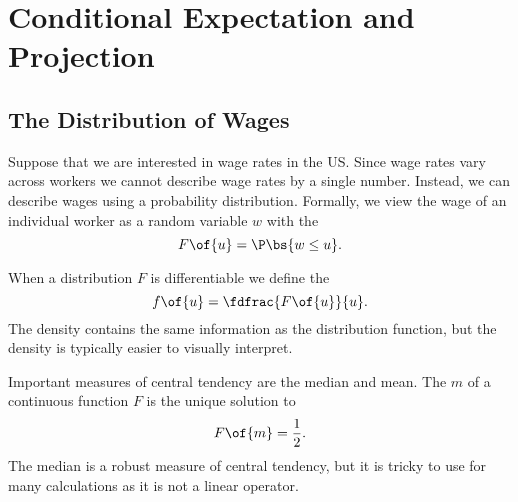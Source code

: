 
\setcounter{chapter}{1}
\chapter{Conditional Expectation and Projection}


\setcounter{section}{1}

\section{The Distribution of Wages}

Suppose that we are interested in wage rates in the US. Since wage rates vary across workers we cannot describe wage rates by a single number. Instead, we can describe wages using a probability distribution. Formally, we view the wage of an individual worker as a random variable $w$ with the 
\begin{equation}
    \notag 
    F\of{u} = \P\bs{w \leq u}.
\end{equation}

When a distribution $F$ is differentiable we define the  
\begin{equation}
    \notag 
    f\of{u} = \fdfrac{F\of{u}}{u}.
\end{equation}
The density contains the same information as the distribution function, but the density is typically easier to visually interpret.

Important measures of central tendency are the median and mean. The  $m$ of a continuous function $F$ is the unique solution to 
\begin{equation}
    \notag 
    F\of{m} = \frac{1}{2}.
\end{equation}
The median is a robust measure of central tendency, but it is tricky to use for many calculations as it is not a linear operator.

